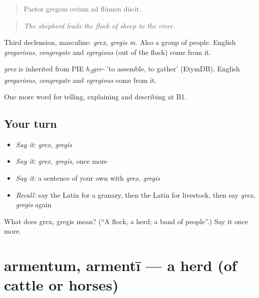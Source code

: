 \begin{quote}
Pastor gregem ovium ad flūmen dūcit.
\end{quote}

\begin{quote}
\emph{The shepherd leads the flock of sheep to the river.}
\end{quote}

Third declension, masculine: \emph{grex, gregis m.} Also a group of people. English \emph{gregarious}, \emph{congregate} and \emph{egregious} (out of the flock) come from it.

\begin{cousinweb}
\emph{grex} is inherited from PIE \emph{h\textsubscript{2}ger-} 'to assemble, to gather' (EtymDB). English \emph{gregarious}, \emph{congregate} and \emph{egregious} come from it.
\end{cousinweb}

\begin{grammarlens}[title={What you've built}]
One more word for telling, explaining and describing at B1.
\end{grammarlens}

\subsection*{Your turn}
\begin{itemize}
\raggedright
  \item \emph{Say it:} \emph{grex, gregis}
  \item \emph{Say it:} \emph{grex, gregis}, once more
  \item \emph{Say it:} a sentence of your own with \emph{grex, gregis}
  \item \emph{Recall:} say the Latin for a granary, then the Latin for livestock, then say \emph{grex, gregis} again
\end{itemize}

\begin{tcolorbox}[breakable,colback=teal!4,colframe=teal!35!black,title={Before you move on}]
What does grex, gregis mean? (\textquotedblleft{}A flock, a herd; a band of people\textquotedblright{}.) Say it once more.
\end{tcolorbox}
\section[armentum, armentī]{armentum, armentī — a herd (of cattle or horses)}

\label{lesson:LA-C477-armentum}



